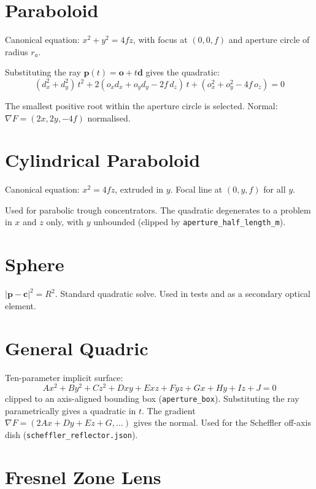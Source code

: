 \documentclass[12pt,a4paper]{report}
\begin{document}
\section{Paraboloid}

Canonical equation: $x^2 + y^2 = 4fz$, with focus at $(0,0,f)$ and aperture circle of
radius $r_a$.

Substituting the ray $\mathbf{p}(t) = \mathbf{o} + t\mathbf{d}$ gives the quadratic:
\begin{equation}
  (d_x^2 + d_y^2)\,t^2 + 2(o_x d_x + o_y d_y - 2f\,d_z)\,t + (o_x^2 + o_y^2 - 4f\,o_z) = 0
\end{equation}

The smallest positive root within the aperture circle is selected.  Normal: $\nabla F =
(2x, 2y, -4f)$ normalised.

\section{Cylindrical Paraboloid}

Canonical equation: $x^2 = 4fz$, extruded in $y$.  Focal line at $(0, y, f)$ for all $y$.

Used for parabolic trough concentrators.  The quadratic degenerates to a problem in $x$ and
$z$ only, with $y$ unbounded (clipped by \texttt{aperture\_half\_length\_m}).

\section{Sphere}

$|\mathbf{p} - \mathbf{c}|^2 = R^2$.  Standard quadratic solve.  Used in tests and as a
secondary optical element.

\section{General Quadric}

Ten-parameter implicit surface:
\begin{equation}
  Ax^2 + By^2 + Cz^2 + Dxy + Exz + Fyz + Gx + Hy + Iz + J = 0
\end{equation}
clipped to an axis-aligned bounding box (\texttt{aperture\_box}).  Substituting the ray
parametrically gives a quadratic in $t$.  The gradient $\nabla F = (2Ax + Dy + Ez + G,
\ldots)$ gives the normal.  Used for the Scheffler off-axis dish (\texttt{scheffler\_reflector.json}).

\section{Fresnel Zone Lens}
\end{document}
